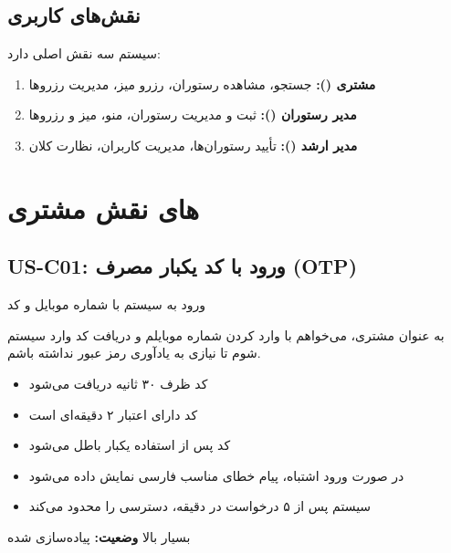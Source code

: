\documentclass[12pt, a4paper]{article}
\begin{document}
\subsection{نقش‌های کاربری}
سیستم سه نقش اصلی دارد:
\begin{enumerate}[rightmargin=0.5cm]
  \item \textbf{مشتری ():} جستجو، مشاهده رستوران، رزرو میز، مدیریت رزروها
  \item \textbf{مدیر رستوران ():} ثبت و مدیریت رستوران، منو، میز و رزروها
  \item \textbf{مدیر ارشد ():} تأیید رستوران‌ها، مدیریت کاربران، نظارت کلان
\end{enumerate}

\newpage

\section{های نقش مشتری}

\subsection{US-C01: ورود با کد یکبار مصرف (OTP)}
\begin{description}[rightmargin=0.5cm]
  \item[عنوان:] ورود به سیستم با شماره موبایل و کد 
  \item[داستان:] به عنوان مشتری، می‌خواهم با وارد کردن شماره موبایلم و دریافت کد 
  وارد سیستم شوم تا نیازی به یادآوری رمز عبور نداشته باشم.
  \item[معیارهای پذیرش:]
  \begin{itemize}[rightmargin=0.5cm]
    \item کد  ظرف ۳۰ ثانیه دریافت می‌شود
    \item کد دارای اعتبار ۲ دقیقه‌ای است
    \item کد پس از استفاده یکبار باطل می‌شود
    \item در صورت ورود اشتباه، پیام خطای مناسب فارسی نمایش داده می‌شود
    \item سیستم پس از ۵ درخواست در دقیقه، دسترسی را محدود می‌کند
  \end{itemize}
  \item[اولویت:] بسیار بالا \quad \textbf{وضعیت:} پیاده‌سازی شده
\end{description}
\end{document}
